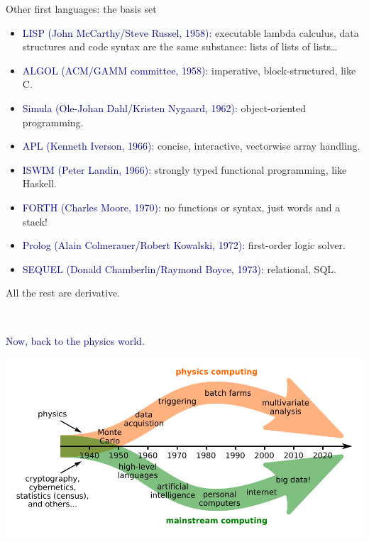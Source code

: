 \documentclass[aspectratio=169]{beamer}
\begin{document}
\begin{frame}{Other first languages: the basis set}
\vspace{0.35 cm}
\begin{itemize}\setlength{\itemsep}{0.3 cm}
\item \textcolor{darkblue}{LISP (John McCarthy/Steve Russel, 1958):} executable lambda calculus, data structures and code syntax are the same substance: lists of lists of lists\ldots

\item \textcolor{darkblue}{ALGOL (ACM/GAMM committee, 1958):} imperative, block-structured, like C.

\item \textcolor{darkblue}{Simula (Ole-Johan Dahl/Kristen Nygaard, 1962):} object-oriented programming.

\item \textcolor{darkblue}{APL (Kenneth Iverson, 1966):} concise, interactive, vectorwise array handling.

\item \textcolor{darkblue}{ISWIM (Peter Landin, 1966):} strongly typed functional programming, like Haskell.

\item \textcolor{darkblue}{FORTH (Charles Moore, 1970):} no functions or syntax, just words and a stack!

\item \textcolor{darkblue}{Prolog (Alain Colmerauer/Robert Kowalski, 1972):} first-order logic solver.

\item \textcolor{darkblue}{SEQUEL (Donald Chamberlin/Raymond Boyce, 1973):} relational, SQL.
\end{itemize}

\begin{center}
\LARGE
All the rest are derivative.
\end{center}
\end{frame}

\begin{frame}{\mbox{ }}
\vspace{0.5 cm}
\huge
\begin{center}
\textcolor{darkblue}{Now, back to the physics world.}

\vspace{0.5 cm}
\includegraphics[width=0.75\linewidth]{PLOTS/grand-timeline.pdf}
\end{center}
\end{frame}
\end{document}
